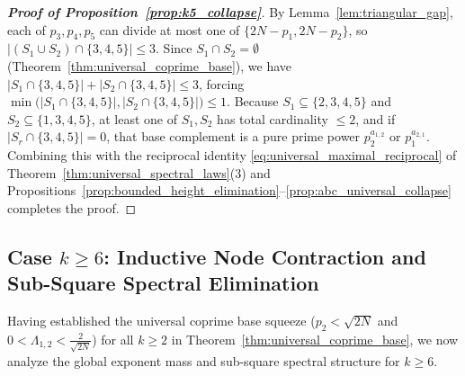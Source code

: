 \documentclass[11pt,a4paper]{article}
\theoremstyle{definition}
\begin{document}
\begin{proof}[\textbf{Proof of Proposition~\ref{prop:k5_collapse}}]
By Lemma~\ref{lem:triangular_gap}, each of $p_3, p_4, p_5$ can divide at most one of $\{2N - p_1, 2N - p_2\}$, so $|(S_1 \cup S_2) \cap \{3, 4, 5\}| \le 3$. Since $S_1 \cap S_2 = \emptyset$ (Theorem~\ref{thm:universal_coprime_base}), we have $|S_1 \cap \{3, 4, 5\}| + |S_2 \cap \{3, 4, 5\}| \le 3$, forcing $\min\bigl(|S_1 \cap \{3, 4, 5\}|, |S_2 \cap \{3, 4, 5\}|\bigr) \le 1$. Because $S_1 \subseteq \{2, 3, 4, 5\}$ and $S_2 \subseteq \{1, 3, 4, 5\}$, at least one of $S_1, S_2$ has total cardinality $\le 2$, and if $|S_r \cap \{3, 4, 5\}| = 0$, that base complement is a pure prime power $p_2^{a_{1,2}}$ or $p_1^{a_{2,1}}$. Combining this with the reciprocal identity \eqref{eq:universal_maximal_reciprocal} of Theorem~\ref{thm:universal_spectral_laws}(3) and Propositions~\ref{prop:bounded_height_elimination}--\ref{prop:abc_universal_collapse} completes the proof.
\end{proof}

\subsection{Case \texorpdfstring{$k \ge 6$}{k >= 6}: Inductive Node Contraction and Sub-Square Spectral Elimination}
\label{subsec:large_islands}

Having established the universal coprime base squeeze ($p_2 < \sqrt{2N}$ and $0 < \Lambda_{1,2} < \frac{2}{\sqrt{2N}}$) for all $k \ge 2$ in Theorem~\ref{thm:universal_coprime_base}, we now analyze the global exponent mass and sub-square spectral structure for $k \ge 6$.
\end{document}
